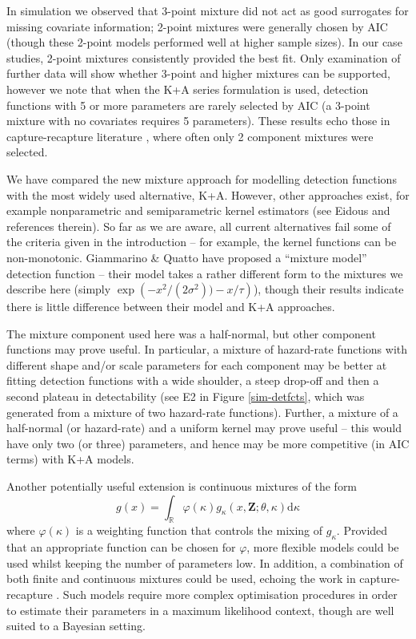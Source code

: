 \documentclass[10pt]{article}
\begin{document}
In simulation we observed that 3-point mixture did not act as good surrogates for missing covariate information; 2-point mixtures were generally chosen by AIC (though these 2-point models performed well at higher sample sizes). In our case studies, 2-point mixtures consistently provided the best fit. Only examination of further data will show whether 3-point and higher mixtures can be supported, however we note that when the K+A series formulation is used, detection functions with 5 or more parameters are rarely selected by AIC (a 3-point mixture with no covariates requires 5 parameters). These results echo those in capture-recapture literature \cite{Pledger:2000tc}, where often only 2 component mixtures were selected.

We have compared the new mixture approach for modelling detection functions with the most widely used alternative, K+A. However, other approaches exist, for example nonparametric and semiparametric kernel estimators (see Eidous \cite{Eidous:2011} and references therein). So far as we are aware, all current alternatives fail some of the criteria given in the introduction -- for example, the kernel functions can be non-monotonic. Giammarino \& Quatto \cite{Giammarino:2014eg} have proposed a ``mixture model'' detection function -- their model takes a rather different form to the mixtures we describe here (simply $\exp\left( -x^2/(2\sigma^2)) - x/\tau\right)$), though their results indicate there is little difference between their model and K+A approaches.

The mixture component used here was a half-normal, but other component functions may prove useful.  In particular, a mixture of hazard-rate functions with different shape and/or scale parameters for each component may be better at fitting detection functions with a wide shoulder, a steep drop-off and then a second plateau in detectability (see E2 in Figure \ref{sim-detfcts}, which was generated from a mixture of two hazard-rate functions).  Further, a mixture of a half-normal (or hazard-rate) and a uniform kernel may prove useful -- this would have only two (or three) parameters, and hence may be more competitive (in AIC terms) with K+A models.

Another potentially useful extension is continuous mixtures of the form
\begin{equation*}
g(x) = \int_\mathbb{R} \varphi(\kappa) g_\kappa(x,\mathbf{Z}; \theta, \kappa) \text{d}\kappa
\end{equation*}
where $\varphi(\kappa)$ is a weighting function that controls the mixing of $g_\kappa$. Provided that an appropriate function can be chosen for $\varphi$, more flexible models could be used whilst keeping the number of parameters low. In addition, a combination of both finite and continuous mixtures could be used, echoing the work in capture-recapture \cite{Morgan:2008wy}. Such models require more complex optimisation procedures in order to estimate their parameters in a maximum likelihood context, though are well suited to a Bayesian setting.
\end{document}
